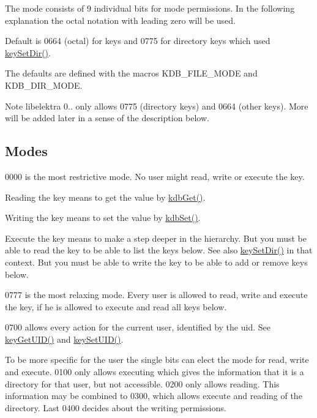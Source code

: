 The mode consists of 9 individual bits for mode permissions. In the following explanation the octal notation with leading zero will be used.

Default is 0664 (octal) for keys and 0775 for directory keys which used \hyperlink{group__meta_gaae575bd86a628a15ee45baa860522e75}{key\+Set\+Dir()}.

The defaults are defined with the macros K\+D\+B\+\_\+\+F\+I\+L\+E\+\_\+\+M\+O\+DE and K\+D\+B\+\_\+\+D\+I\+R\+\_\+\+M\+O\+DE.

\begin{DoxyNote}{Note}
libelektra 0.. only allows 0775 (directory keys) and 0664 (other keys). More will be added later in a sense of the description below.
\end{DoxyNote}
\hypertarget{group__meta_mode}{}\subsection{Modes}\label{group__meta_mode}
0000 is the most restrictive mode. No user might read, write or execute the key.

Reading the key means to get the value by \hyperlink{group__kdb_ga28e385fd9cb7ccfe0b2f1ed2f62453a1}{kdb\+Get()}.

Writing the key means to set the value by \hyperlink{group__kdb_ga11436b058408f83d303ca5e996832bcf}{kdb\+Set()}.

Execute the key means to make a step deeper in the hierarchy. But you must be able to read the key to be able to list the keys below. See also \hyperlink{group__meta_gaae575bd86a628a15ee45baa860522e75}{key\+Set\+Dir()} in that context. But you must be able to write the key to be able to add or remove keys below.

0777 is the most relaxing mode. Every user is allowed to read, write and execute the key, if he is allowed to execute and read all keys below.

0700 allows every action for the current user, identified by the uid. See \hyperlink{group__meta_gacaa5060e67b03f50ae49a3620c54bc46}{key\+Get\+U\+I\+D()} and \hyperlink{group__meta_gab5f284f5ecd261e0a290095f50ba1af7}{key\+Set\+U\+I\+D()}.

To be more specific for the user the single bits can elect the mode for read, write and execute. 0100 only allows executing which gives the information that it is a directory for that user, but not accessible. 0200 only allows reading. This information may be combined to 0300, which allows execute and reading of the directory. Last 0400 decides about the writing permissions.

